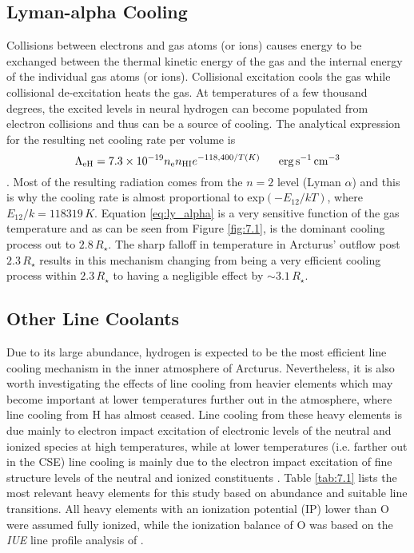 \subsection{Lyman-alpha Cooling}\label{sec:7.3.3}
Collisions between electrons and gas atoms (or ions) causes energy to be exchanged between the thermal kinetic energy of the gas and the internal energy of the individual gas atoms (or ions). Collisional excitation cools the gas while collisional de-excitation heats the gas. At temperatures of a few thousand degrees, the excited levels in neural hydrogen can become populated from electron collisions and thus can be a source of cooling. The analytical expression for the resulting net cooling rate per volume is
\begin{equation}
\label{eq:ly_alpha}
\Lambda _{\rm{eH}} = 7.3\times 10^{-19}n_{\rm{e}}n_{\rm{HI}}e^{-118,400/T(K)} \ \ \ \ \ \rm{erg\,s^{-1}\,cm^{-3}}
\end{equation}
\cite{spitzer_1978}. Most of the resulting radiation comes from the $n=2$ level (Lyman $\alpha$) and this is why the cooling rate is almost proportional to exp$(-E_{12}/kT)$, where $E_{12}/k=118319\,K$. Equation \ref{eq:ly_alpha} is a very sensitive function of the gas temperature and as can be seen from Figure \ref{fig:7.1}, is the dominant cooling process out to $2.8\,R_{\star}$. The sharp falloff in temperature in Arcturus' outflow post $2.3\,R_{\star}$ results in this mechanism changing from being a very efficient cooling process within $2.3\,R_{\star}$ to having a negligible effect by $\sim 3.1\,R_{\star}$.

\subsection{Other Line Coolants}\label{sec:7.3.4}
Due to its large abundance, hydrogen is expected to be the most efficient line cooling mechanism in the inner atmosphere of Arcturus. Nevertheless, it is also worth investigating the effects of line cooling from heavier elements which may become important at lower temperatures further out in the atmosphere, where line cooling from H has almost ceased. Line cooling from these heavy elements is due mainly to electron impact excitation of electronic levels of the neutral and ionized species at high temperatures, while at lower temperatures (i.e. farther out in the CSE) line cooling is mainly due to the electron impact excitation of fine structure levels of the neutral and ionized constituents \citep{dalgarno_1972}. Table \ref{tab:7.1} lists the most relevant heavy elements for this study based on abundance and suitable line transitions. All heavy elements with an ionization potential (IP) lower than O were assumed fully ionized,  while the ionization balance of O was based on the \textit{IUE} line profile analysis of \cite{judge_1986}.

